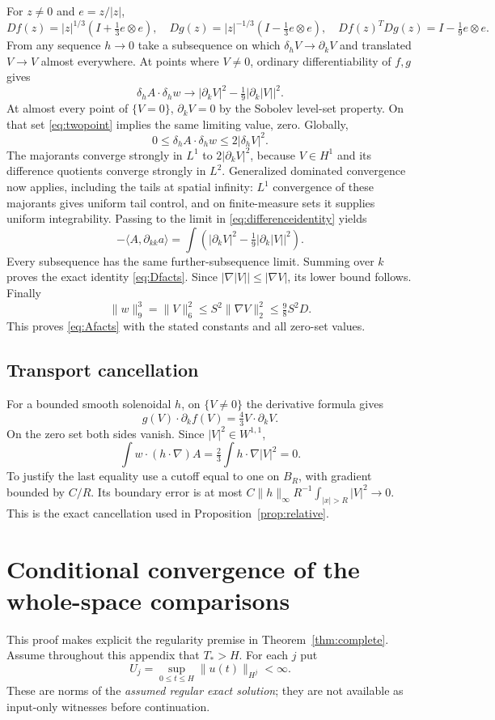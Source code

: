 \documentclass[11pt,a4paper]{article}
\theoremstyle{definition}\newtheorem{definition}[theorem]{Definition}
\theoremstyle{remark}\newtheorem{remark}[theorem]{Remark}
\newcommand{\norm}[1]{\lVert #1\rVert}
\newcommand{\ip}[2]{\langle #1,#2\rangle}
\numberwithin{equation}{section}
\begin{document}
For $z\ne0$ and $e=z/|z|$,
\begin{equation}\label{eq:naturalmatrix}
 Df(z)=|z|^{1/3}(I+\tfrac13e\otimes e),\quad
 Dg(z)=|z|^{-1/3}(I-\tfrac13e\otimes e),\quad
 Df(z)^TDg(z)=I-\tfrac19e\otimes e.
\end{equation}
From any sequence $h\to0$ take a subsequence on which $\delta_hV\to\partial_kV$ and translated $V\to V$ almost everywhere. At points where $V\ne0$, ordinary differentiability of $f,g$ gives
\[
 \delta_hA\cdot\delta_hw\longrightarrow
 |\partial_kV|^2-\tfrac19|\partial_k|V||^2.
\]
At almost every point of $\{V=0\}$, $\partial_kV=0$ by the Sobolev level-set property. On that set \eqref{eq:twopoint} implies the same limiting value, zero. Globally,
\[
 0\le\delta_hA\cdot\delta_hw\le2|\delta_hV|^2.
\]
The majorants converge strongly in $L^1$ to $2|\partial_kV|^2$, because $V\in H^1$ and its difference quotients converge strongly in $L^2$. Generalized dominated convergence now applies, including the tails at spatial infinity: $L^1$ convergence of these majorants gives uniform tail control, and on finite-measure sets it supplies uniform integrability. Passing to the limit in \eqref{eq:differenceidentity} yields
\[
 -\ip A{\partial_{kk}a}
 =\int\left(|\partial_kV|^2-\tfrac19|\partial_k|V||^2\right).
\]
Every subsequence has the same further-subsequence limit. Summing over $k$ proves the exact identity \eqref{eq:Dfacts}. Since $|\nabla|V||\le|\nabla V|$, its lower bound follows. Finally
\[
 \norm w_9^3=\norm V_6^2\le S^2\norm{\nabla V}_2^2\le\tfrac98S^2D.
\]
This proves \eqref{eq:Afacts} with the stated constants and all zero-set values.

\subsection{Transport cancellation}
For a bounded smooth solenoidal $h$, on $\{V\ne0\}$ the derivative formula gives
\[
 g(V)\cdot\partial_kf(V)=\tfrac43V\cdot\partial_kV.
\]
On the zero set both sides vanish. Since $|V|^2\in W^{1,1}$,
\[
 \int w\cdot(h\cdot\nabla)A
 =\tfrac23\int h\cdot\nabla|V|^2=0.
\]
To justify the last equality use a cutoff equal to one on $B_R$, with gradient bounded by $C/R$. Its boundary error is at most
$C\norm h_\infty R^{-1}\int_{|x|>R}|V|^2\to0$. This is the exact cancellation used in Proposition~\ref{prop:relative}.

\section{Conditional convergence of the whole-space comparisons}
\label{app:convergence}
This proof makes explicit the regularity premise in Theorem~\ref{thm:complete}. Assume throughout this appendix that $T_*>H$. For each $j$ put
\[
 U_j=\sup_{0\le t\le H}\norm{u(t)}_{H^j}<\infty.
\]
These are norms of the \emph{assumed regular exact solution}; they are not available as input-only witnesses before continuation.
\end{document}
